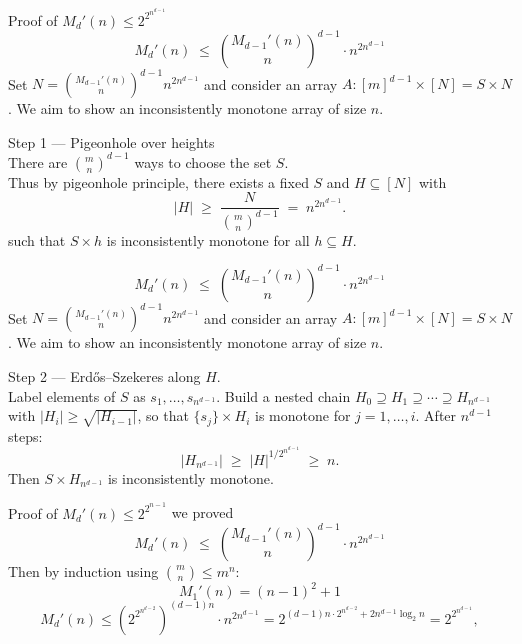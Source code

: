 \begin{frame}{Proof of \(M_d'(n)\leq 2^{2^{n^{d-1}}}\)}
    \[
  M_d'(n) \;\leq\; \binom{M_{d-1}'(n)}{n}^{\!d-1} \cdot n^{2n^{d-1}}
\]
Set \( N = \binom{M_{d-1}'(n)}{n}^{d-1} n^{2n^{d-1}} \) and consider an array \( A : [m]^{d-1} \times [N] =S\times N\). We aim to show an inconsistently monotone array of size \(n\).\\
    \pause
  \begin{ffact}{Step 1 — Pigeonhole over heights}\\
  There are \(\binom{m}{n}^{d-1}\) ways to choose the set \(S\).\\
  Thus by pigeonhole principle, there exists a fixed \( S \) and \( H \subseteq [N] \) with
  \[
    |H| \;\geq\; \frac{N}{\binom{m}{n}^{d-1}} \;=\; n^{2n^{d-1}}.
  \]
  such that \(S\times h\) is inconsistently monotone for all \(h \subseteq H\).
  
  \end{ffact}
\end{frame}
\begin{frame}{}
    \[
  M_d'(n) \;\leq\; \binom{M_{d-1}'(n)}{n}^{\!d-1} \cdot n^{2n^{d-1}}
\]
Set \( N = \binom{M_{d-1}'(n)}{n}^{d-1} n^{2n^{d-1}} \) and consider an array \( A : [m]^{d-1} \times [N] =S\times N\). We aim to show an inconsistently monotone array of size \(n\).\\
  \begin{ffact}{Step 2 — Erd\H{o}s--Szekeres along \( H \).}\\
  Label elements of \( S \) as \( s_1,\ldots,s_{n^{d-1}} \).
  Build a nested chain
  \( H_0 \supseteq H_1 \supseteq \cdots \supseteq H_{n^{d-1}} \)
  with \( |H_i| \geq \sqrt{|H_{i-1}|} \), so that \( \{s_j\}\times H_i \)
  is monotone for \( j = 1,\ldots,i \). After \( n^{d-1} \) steps:
  \vspace{-0.5cm}
  \[
    |H_{n^{d-1}}| \;\geq\; |H|^{1/2^{n^{d-1}}} \;\geq\; n.
  \]
  \vspace{-0.5cm}
  Then \(S \times H_{n^{d-1}} \) is inconsistently monotone.
  \end{ffact}
\end{frame}
\begin{frame}{Proof of \(M_d'(n)\leq 2^{2^{n-1}}\)}
    we proved     \[
  M_d'(n) \;\leq\; \binom{M_{d-1}'(n)}{n}^{\!d-1} \cdot n^{2n^{d-1}}
\]
Then by induction using \(\binom{m}{n}\leq m^n\):
\[M_1'(n)=(n-1)^2+1\]
    \[
      M_d'(n)
      \leq \left(2^{2^{n^{d-2}}}\right)^{(d-1)n}\cdot n^{2n^{d-1}}
      = 2^{(d-1)n\cdot 2^{n^{d-2}}+2n^{d-1}\log_2 n}
      = 2^{2^{n^{d-1}}},
    \]
\end{frame}


